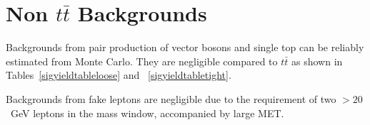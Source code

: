 \section{Non $t\bar{t}$ Backgrounds}
\label{sec:othBG}

Backgrounds from pair production of vector bosons and single top
can be reliably estimated from Monte Carlo.
They are negligible compared to $t\bar{t}$ as shown in Tables~\ref{sigyieldtableloose} and ~\ref{sigyieldtabletight}.

Backgrounds from fake leptons are negligible due to the requirement of two \pt$ > 20$~GeV leptons
in the \Z mass window, accompanied by large MET.



